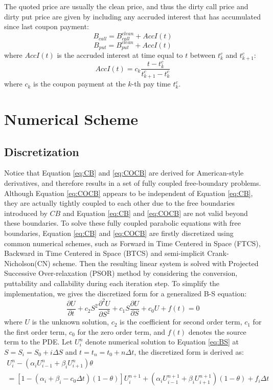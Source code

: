 \documentclass[12pt]{article}
\begin{document}
The quoted price are usually the clean price, and thus the dirty call price and dirty put price are given by including any accruded interest that has accumulated since last coupon payment:
\[B_{call} = B_{call}^{clean} + AccI(t)\]
\[B_{put} = B_{put}^{clean} + AccI(t)\]
where $AccI(t)$ is the accruded interest at time equal to $t$ between $t_k^c$ and $t_{k+1}^c$:
\[
AccI(t) = c_k\frac{t-t_k^c}{t_{k+1}^c - t_k^c}
\]
where $c_k$ is the coupon payment at the $k$-th pay time $t_k^c$.

\section{Numerical Scheme}
\subsection{Discretization}
Notice that Equation \ref{eq:CB} and \ref{eq:COCB} are derived for American-style derivatives, and therefore results in a set of fully coupled free-boundary problems. Although Equation \ref{eq:COCB} appears to be independent of Equation \ref{eq:CB}, they are actually tightly coupled to each other due to the free boundaries introduced by $CB$ and Equation \ref{eq:CB} and \ref{eq:COCB} are not valid beyond these boundaries. To solve these fully coupled parabolic equations with free boundaries, Equation \ref{eq:CB} and \ref{eq:COCB} are firstly discretized using common numerical schemes, such as Forward in Time Centered in Space (FTCS), Backward in Time Centered in Space (BTCS) and semi-implicit Crank-Nicholson(CN) scheme. Then the resulting linear system is solved with Projected Successive Over-relaxation (PSOR) method by considering the conversion, puttability and callability during each iteration step. To simplify the implementation, we gives the discretized form for a generalized B-S equation:
\begin{equation}
\frac{\partial{U}}{\partial{t}} + 
c_2S^2\frac{\partial^2{U}}{\partial{S}^2} + c_1S\frac{\partial{U}}{\partial{S}} + c_0U + f(t) = 0 \label{eq:BS}
\end{equation}
where $U$ is the unknown solution, $c_2$ is the coefficient for second order term, $c_1$ for the first order term, $c_0$ for the zero order term, and $f(t)$ denotes the source term to the PDE. Let $U^n_i$ denote numerical solution to Equation \ref{eq:BS} at $S = S_i = S_0 + i \Delta S$ and $t = t_n = t_0 + n \Delta t$, the discretized form is derived as:
\begin{eqnarray*}
[1 + (\alpha_{i}+\beta_{i} - c_0 \Delta t)\theta] U_i^n 
- (\alpha_i U_{i-1}^n + \beta_i U_{i+1}^n)\theta \\
= [1 - (\alpha_i+\beta_i - c_0 \Delta t)(1-\theta)] U_i^{n+1} 
+ (\alpha_i U_{i-1}^{n+1} 
+ \beta_i U_{i+1}^{n+1})(1-\theta) + f_i \Delta t
\end{eqnarray*}
\end{document}
